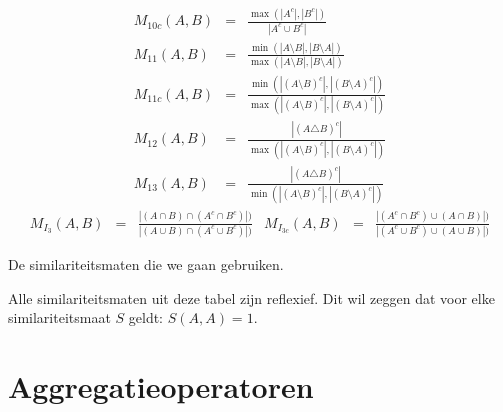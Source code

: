 \begin{table}[tp]
$$\begin{array}{rcl}
\displaystyle M_{10c}(A,B) & = & \displaystyle \frac{\max (|A^c|,|B^c|)}{|A^c \cup B^c|} \\[10pt]
\displaystyle M_{11}(A,B) & = & \displaystyle \frac{\min (|A \setminus B|,|B \setminus A|)}{\max (|A \setminus B|,|B \setminus A|)} \\[10pt]
\displaystyle M_{11c}(A,B) & = & \displaystyle \frac{\min (|(A \setminus B)^c|,|(B \setminus A)^c|)}{\max (|(A \setminus B)^c|,|(B \setminus A)^c|)} \\[10pt]
\displaystyle M_{12}(A,B) & = & \displaystyle \frac{|(A \triangle B)^c|}{\max (|(A \setminus B)^c|,|(B \setminus A)^c|)} \\[10pt]
\displaystyle M_{13}(A,B) & = & \displaystyle \frac{|(A \triangle B)^c|}{\min (|(A \setminus B)^c|,|(B \setminus A)^c|)}
\end{array}
$$
$$
\begin{array}{rcl}
\displaystyle M_{I_3}(A,B) & = & \displaystyle \frac{|(A \cap B) \cap (A^c \cap B^c)|)}{|(A \cup B) \cap (A^c \cup B^c)|)}
\end{array}
\begin{array}{rcl}
\displaystyle M_{I_{3c}}(A,B) & = & \displaystyle \frac{|(A^c \cap B^c) \cup (A \cap B)|)}{|(A^c \cup B^c) \cup (A \cup B)|)}
\end{array}
$$
\caption{De similariteitsmaten die we gaan gebruiken.}
\label{tab:similatiteitsmaten}
\end{table}

Alle similariteitsmaten uit deze tabel zijn reflexief. Dit wil zeggen dat 
voor elke similariteitsmaat $S$ geldt: $S(A,A)=1$. 

\section{Aggregatieoperatoren} 